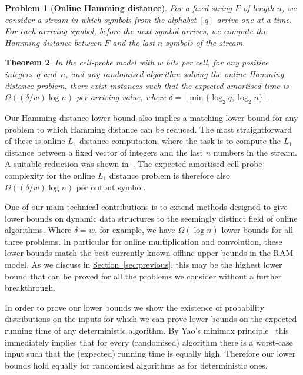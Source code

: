 \documentclass[11pt]{article}
\numberwithin{equation}{section}
\newtheorem{theorem}{Theorem}[section]
\theoremstyle{definition}
\theoremstyle{plain}
\newcommand{\expref}[2]{\hyperref[#2]{#1~\ref{#2}}}
\newtheorem{problem}[theorem]{Problem}
\begin{document}
%

\begin{problem}[\textbf{Online Hamming distance}]
  For a fixed string $F$ of length $n$, we consider a stream in which symbols from the alphabet $[q]$ arrive one at a time. For each arriving symbol, before the next symbol arrives, we
%
compute   %
the Hamming distance between $F$ and the last $n$ symbols of the stream.
\end{problem}

\begin{theorem}
	\label{thm:ham}
	In the cell-probe model with $w$ bits per cell, for any positive integers~$q$ and~$n$, and any randomised algorithm solving the online Hamming distance problem, there exist instances such that the expected amortised time is $\Omega(({\delta}/{w})\log n)$ per arriving value, where $\delta=\lceil \min\{\log_2q,\log_2n\} \rceil$.
\end{theorem}

%

%

Our Hamming distance lower bound also implies a matching lower bound for any problem
%
to which Hamming distance can be reduced.   %
The most straightforward of these is online $L_1$ distance computation, where the task is to
%
compute   %
the $L_1$ distance between a fixed vector of integers and the last $n$ numbers in the stream.
A suitable reduction was shown in~\cite{LP:2008}. The expected amortised cell probe complexity for the online $L_1$ distance problem is therefore also $\Omega{(({\delta}/{w}) \log n)}$ per
%
output symbol.  %

One of our main technical contributions is to extend  methods designed to give lower bounds on dynamic data structures to the seemingly distinct field of online algorithms.  Where $\delta = w$, for example, we have $\Omega(\log{n})$ lower bounds for all three problems. In particular for online multiplication and convolution, these lower bounds match the
%
best currently known   %
offline upper bounds in the RAM model. As we discuss in
%
\expref{Section}{sec:previous}, this may be the highest lower bound that can be
%
proved for all the problems we consider without a further
%
%
breakthrough.

In order to prove our lower bounds we show the existence of probability distributions on the inputs for which we can prove lower bounds on the expected running time of any deterministic algorithm. By Yao's minimax principle~\cite{Yao1977:Minimax} this immediately implies that for every (randomised) algorithm there is a worst-case input such that the (expected) running time is equally high. Therefore our lower bounds hold equally for randomised algorithms as for deterministic ones.
\end{document}

